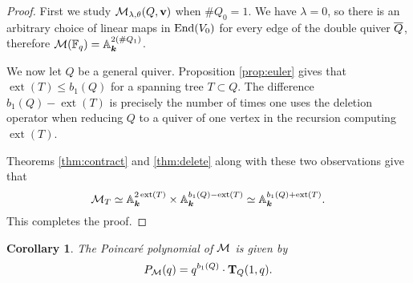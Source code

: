 \documentclass{amsart}
\newtheorem{cor}[thm]{Corollary}
\newtheorem{prop}[thm]{Proposition}
\theoremstyle{definition}
\DeclareMathOperator{\extact}{ext}
\begin{document}
\begin{proof}
First we study $\mathcal{M}_{\lambda,\theta}(Q, \mathbf{v})$ when $\# Q_0=1$. We have $\lambda=0$, so there is an arbitrary choice of linear maps in $\operatorname{End}(V_0)$ for every edge of the double quiver ${\overline{Q}}$, therefore $\mathcal{M}(\mathbb{F}_q)=\mathbb{A}_{\boldsymbol{k}}^{2 (\#Q_1)}$.

We now let $Q$ be a general quiver. 
Proposition \ref{prop:euler} gives that $\extact(T) \leq b_1(Q)$ for a spanning tree $T \subset Q$.
The difference $b_1(Q)-\extact(T)$ is precisely the number of times one uses the deletion operator when reducing $Q$ to a quiver of one vertex in the recursion computing $\extact(T)$.

Theorems \ref{thm:contract} and \ref{thm:delete} along with these two observations give that \begin{equation*}
    \cM_T \simeq \bA_\bk^{2 \extact(T)} \times \bA_\bk^{b_1(Q)- \extact(T)} \simeq \bA_\bk^{b_1(Q)+\extact(T)}.\end{equation*}
This completes the proof.\end{proof}

\begin{cor}\label{cor:poincare}
The Poincar\'e polynomial of $\mathcal{M}$ is given by
$$P_{\mathcal{M}}(q) = q^{b_1(Q)} \cdot \mathbf{T}_Q(1,q).$$
\end{cor}



\end{document}
